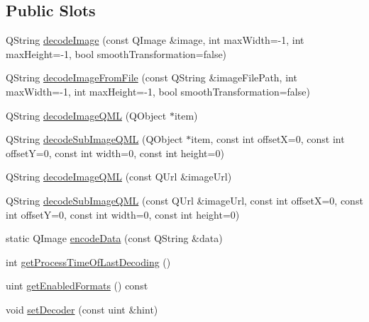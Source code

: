 \subsection*{Public Slots}
\begin{DoxyCompactItemize}
\item 
Q\+String \mbox{\hyperlink{class_q_z_xing_a21f75bdef7ecd2100ed170e1b32470a7}{decode\+Image}} (const Q\+Image \&image, int max\+Width=-\/1, int max\+Height=-\/1, bool smooth\+Transformation=false)
\item 
Q\+String \mbox{\hyperlink{class_q_z_xing_a8e2119732a304523033fe5fd8505c4e9}{decode\+Image\+From\+File}} (const Q\+String \&image\+File\+Path, int max\+Width=-\/1, int max\+Height=-\/1, bool smooth\+Transformation=false)
\item 
Q\+String \mbox{\hyperlink{class_q_z_xing_a6cbd54e03d45b91ff0f33125e4f6caa3}{decode\+Image\+Q\+ML}} (Q\+Object $\ast$item)
\item 
Q\+String \mbox{\hyperlink{class_q_z_xing_a4fdb03f94072d9a47cc0d008967da49b}{decode\+Sub\+Image\+Q\+ML}} (Q\+Object $\ast$item, const int offsetX=0, const int offsetY=0, const int width=0, const int height=0)
\item 
Q\+String \mbox{\hyperlink{class_q_z_xing_aed399aa817f2090d5ac7c9aed51d1b99}{decode\+Image\+Q\+ML}} (const Q\+Url \&image\+Url)
\item 
Q\+String \mbox{\hyperlink{class_q_z_xing_a13ef5bdf62f387df536e4a78088c5700}{decode\+Sub\+Image\+Q\+ML}} (const Q\+Url \&image\+Url, const int offsetX=0, const int offsetY=0, const int width=0, const int height=0)
\item 
static Q\+Image \mbox{\hyperlink{class_q_z_xing_af57e44a47644b0d13edf684515301f2d}{encode\+Data}} (const Q\+String \&data)
\item 
int \mbox{\hyperlink{class_q_z_xing_ab15359090739e8dc9850d965caca8eca}{get\+Process\+Time\+Of\+Last\+Decoding}} ()
\item 
uint \mbox{\hyperlink{class_q_z_xing_a863d1ac83ea9728880d0494a5d8e98e0}{get\+Enabled\+Formats}} () const
\item 
void \mbox{\hyperlink{class_q_z_xing_ab8292973f0e6820b763dd5bc0fd3060e}{set\+Decoder}} (const uint \&hint)
\end{DoxyCompactItemize}
